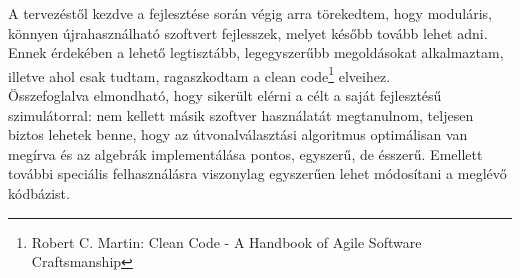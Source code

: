   A tervezéstől kezdve a fejlesztése során végig arra törekedtem, hogy moduláris, könnyen újrahasználható szoftvert fejlesszek, melyet később tovább lehet adni. Ennek érdekében a lehető legtisztább, legegyszerűbb megoldásokat alkalmaztam, illetve ahol csak tudtam, ragaszkodtam a clean code\footnote{Robert C. Martin: Clean Code - A Handbook of Agile Software Craftsmanship} elveihez.\\

  Összefoglalva elmondható, hogy sikerült elérni a célt a saját fejlesztésű szimulátorral: nem kellett másik szoftver használatát megtanulnom, teljesen biztos lehetek benne, hogy az útvonalválasztási algoritmus optimálisan van megírva és az algebrák implementálása pontos, egyszerű, de ésszerű. Emellett további speciális felhasználásra viszonylag egyszerűen lehet módosítani a meglévő kódbázist.
